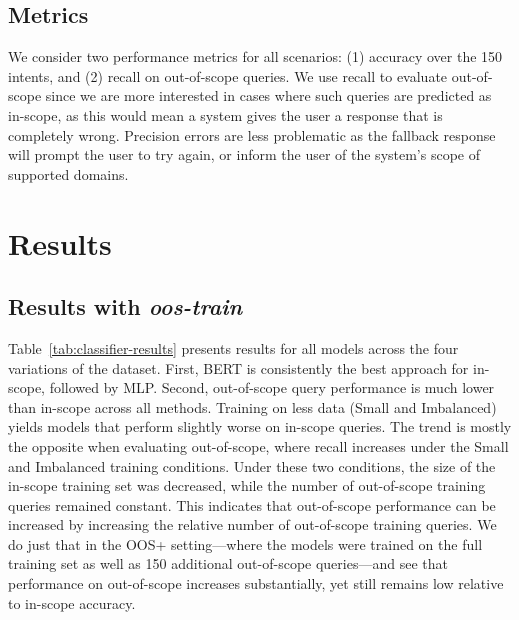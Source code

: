 \documentclass[11pt,a4paper]{article}
\begin{document}
\begin{table}
\centering

\caption{\label{tab:classifier-results}
Benchmark classifier results under each data condition using the \emph{oos-train} (top half) and \emph{oos-threshold} (bottom half) prediction methods.
}
\end{table}


\subsection{Metrics}

We consider two performance metrics for all scenarios:
(1) accuracy over the 150 intents, and
(2) recall on out-of-scope queries.
We use recall to evaluate out-of-scope since we are more interested in cases where such queries are predicted as in-scope, as this
would mean a system gives the user a response that is completely wrong. Precision errors are less problematic as the fallback response will prompt the user to try again, or inform the user of the system's scope of supported domains.

\section{Results}
\subsection{Results with \emph{oos-train}}
Table~\ref{tab:classifier-results} presents results for all models across the four variations of the dataset.
First, BERT is consistently the best approach for in-scope, followed by MLP. Second, out-of-scope query performance is much lower than in-scope across all methods. Training on less data (Small and Imbalanced) yields models that perform slightly worse on in-scope queries.
The trend is mostly the opposite when evaluating out-of-scope, where recall increases under the Small and Imbalanced training conditions. Under these two conditions, the size of the in-scope training set was decreased, while the number of out-of-scope training queries remained constant. This indicates that out-of-scope performance can be increased by increasing the relative number of out-of-scope training queries. We do just that in the OOS+ setting---where the models were trained on the full training set as well as 150 additional out-of-scope queries---and see that performance on out-of-scope increases substantially, yet still remains low relative to in-scope accuracy.
\end{document}
